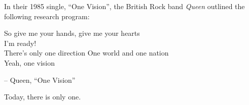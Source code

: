 In their 1985 single, \enquote{One Vision}, 
the British Rock band \textit{Queen} outlined the 
following research program:
\begin{center}
  So give me your hands, give me your hearts\\
  I'm ready!\\
  There's only one direction
  One world and one nation\\
  Yeah, one vision
\end{center}
\begin{flushright}
  \small{
  -- Queen, ``One Vision''}
\end{flushright}

Today, there is only one.
